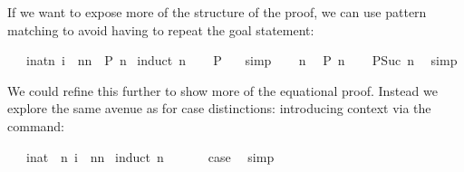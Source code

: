 \begin{isabellebody}
\begin{isamarkuptext}
If we want to expose more of the structure of the
proof, we can use pattern matching to avoid having to repeat the goal
statement:%
\end{isamarkuptext}%
\isamarkuptrue%
\isamarkupfalse%
\ {\isachardoublequoteopen}{}\ {\isacharasterisk}\ {\isacharparenleft}{\isasymSum}i{\isacharcolon}{\isacharcolon}nat{\isasymle}n{\isachardot}\ i{\isacharparenright}\ {\isacharequal}\ n{\isacharasterisk}{\isacharparenleft}n{\isacharplus}{}{\isacharparenright}{\isachardoublequoteclose}\ {\isacharparenleft}\ {\isachardoublequoteopen}{\isacharquery}P\ n{\isachardoublequoteclose}{\isacharparenright}\isanewline
%
\isadelimproof
%
\endisadelimproof
%
\isatagproof
{}\isamarkupfalse%
\ {\isacharparenleft}induct\ n{\isacharparenright}\isanewline
\ \ \isamarkupfalse%
\ {\isachardoublequoteopen}{\isacharquery}P\ {}{\isachardoublequoteclose}\ \isamarkupfalse%
\ simp\isanewline
{}\isamarkupfalse%
\isanewline
\ \ \isamarkupfalse%
\ n\ \isamarkupfalse%
\ {\isachardoublequoteopen}{\isacharquery}P\ n{\isachardoublequoteclose}\isanewline
\ \ \isamarkupfalse%
\ {\isachardoublequoteopen}{\isacharquery}P{\isacharparenleft}Suc\ n{\isacharparenright}{\isachardoublequoteclose}\ \isamarkupfalse%
\ simp\isanewline
{}\isamarkupfalse%
%
\endisatagproof
{\isafoldproof}%
%
\isadelimproof
%
\endisadelimproof
%
\begin{isamarkuptext}%
\noindent We could refine this further to show more of the equational
proof. Instead we explore the same avenue as for case distinctions:
introducing context via the  command:%
\end{isamarkuptext}%
\isamarkuptrue%
\isamarkupfalse%
\ {\isachardoublequoteopen}{}\ {\isacharasterisk}\ {\isacharparenleft}{\isasymSum}i{\isacharcolon}{\isacharcolon}nat\ {\isasymle}\ n{\isachardot}\ i{\isacharparenright}\ {\isacharequal}\ n{\isacharasterisk}{\isacharparenleft}n{\isacharplus}{}{\isacharparenright}{\isachardoublequoteclose}\isanewline
%
\isadelimproof
%
\endisadelimproof
%
\isatagproof
{}\isamarkupfalse%
\ {\isacharparenleft}induct\ n{\isacharparenright}\isanewline
\ \ \isamarkupfalse%
\ {}\ \isamarkupfalse%
\ {\isacharquery}case\ \isamarkupfalse%
\ simp\isanewline
{}\isamarkupfalse%
\isanewline
\ \ \isamarkupfalse%

\end{isabellebody}
